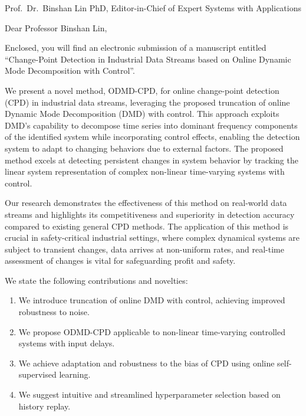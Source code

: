 \documentclass{letter}
\begin{document}
\begin{letter}{Prof.~Dr.~Binshan Lin PhD, Editor-in-Chief of Expert Systems with Applications}

    \opening{Dear Professor Binshan Lin,}

    Enclosed, you will find an electronic submission of a manuscript entitled ``Change-Point Detection in Industrial Data Streams based on Online Dynamic Mode Decomposition with Control''.

    We present a novel method, ODMD-CPD, for online change-point detection (CPD) in industrial data streams, leveraging the proposed truncation of online Dynamic Mode Decomposition (DMD) with control. This approach exploits DMD's capability to decompose time series into dominant frequency components of the identified system while incorporating control effects, enabling the detection system to adapt to changing behaviors due to external factors. The proposed method excels at detecting persistent changes in system behavior by tracking the linear system representation of complex non-linear time-varying systems with control.

    Our research demonstrates the effectiveness of this method on real-world data streams and highlights its competitiveness and superiority in detection accuracy compared to existing general CPD methods. The application of this method is crucial in safety-critical industrial settings, where complex dynamical systems are subject to transient changes, data arrives at non-uniform rates, and real-time assessment of changes is vital for safeguarding profit and safety.

    We state the following contributions and novelties:
    \begin{enumerate}
        \item We introduce truncation of online DMD with control, achieving improved robustness to noise.
        \item We propose ODMD-CPD applicable to non-linear time-varying controlled systems with input delays.
        \item We achieve adaptation and robustness to the bias of CPD using online self-supervised learning.
        \item We suggest intuitive and streamlined hyperparameter selection based on history replay.
    \end{enumerate}


\end{letter}
\end{document}
